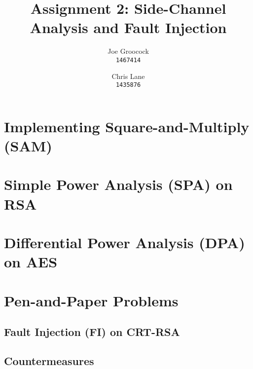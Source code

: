 \documentclass[11pt, a4paper]{article}
\title{Assignment 2: Side-Channel Analysis and Fault Injection}
\author{Joe Groocock    \\ \texttt{\normalsize 1467414}
    \and Chris Lane     \\ \texttt{\normalsize 1435876}
}
\begin{document}
\maketitle

\section{Implementing Square-and-Multiply (SAM)}\label{sec:sam}


\section{Simple Power Analysis (SPA) on RSA}\label{sec:spa}




\section{Differential Power Analysis (DPA) on AES}\label{sec:dpa}


\section{Pen-and-Paper Problems}\label{sec:pen-and-paper}
\subsection{Fault Injection (FI) on CRT-RSA}\label{subsec:fi}


\subsection{Countermeasures}\label{subsec:fi-countermeasures}
\end{document}
